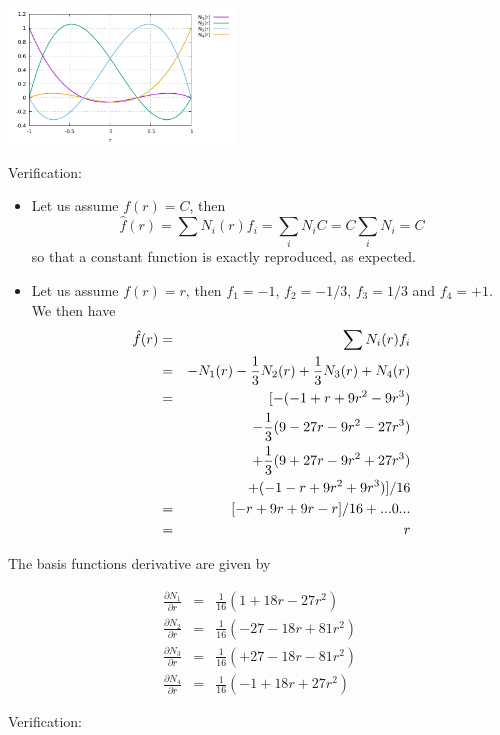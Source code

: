 \begin{center}
\includegraphics[width=6cm]{images/basis1D/cubic.pdf}
\end{center}


Verification:

\begin{itemize}
\item
Let us assume $f(r)=C$, then
\[
\hat{f}(r) = \sum N_i(r) f_i = \sum_i N_i C = C \sum_i N_i  = C
\]
so that a constant function is exactly reproduced, as expected.

\item
Let us assume $f(r)= r$, then $f_1=-1$, $f_2=-1/3$, $f_3=1/3$ and $f_4=+1$. We then have
\begin{eqnarray}
\hat{f}(r) 
&=& \sum N_i(r) f_i  \nonumber\\
&=& - N_1(r) -\frac{1}{3}N_2(r) + \frac{1}{3}N_3(r)  + N_4(r) \nonumber\\
&=& [-(-1+  r+9r^2- 9r^3 ) \nonumber\\
&&- \frac{1}{3} ( 9-27r-9r^2-27r^3 ) \nonumber\\
&&+ \frac{1}{3} ( 9+27r-9r^2+27r^3 ) \nonumber\\
&&+ (-1-  r+9r^2+ 9r^3 )]/16 \nonumber\\
&=& [-r +9r + 9r -r]/16  + ... 0 ... \nonumber\\
&=& r   
\end{eqnarray}

\end{itemize}


The basis functions derivative are given by
\begin{mdframed}[backgroundcolor=blue!5]
\begin{eqnarray}
 \frac{\partial N_1}{\partial r}&=& \frac{1}{16}  (  1 +18r - 27r^2 ) \nonumber\\ 
 \frac{\partial N_2}{\partial r}&=& \frac{1}{16}  (-27 -18r + 81r^2 ) \nonumber\\ 
 \frac{\partial N_3}{\partial r}&=& \frac{1}{16}  (+27 -18r - 81r^2 ) \nonumber\\ 
 \frac{\partial N_4}{\partial r}&=& \frac{1}{16}  ( -1 +18r + 27r^2 ) \nonumber
\end{eqnarray}
\end{mdframed}
Verification:

